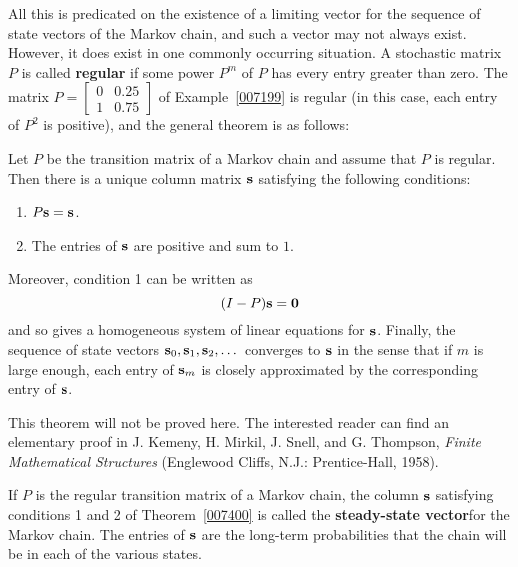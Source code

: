 \documentclass{ximera}
\begin{document}
All this is predicated on the existence of a limiting vector for the sequence of state vectors of the Markov chain, and such a vector may not always exist. However, it does exist in one commonly occurring situation. A stochastic matrix $P$ is called \textbf{regular} if some power $P^{m}$ of $P$ has every entry greater than zero. The matrix $P = \begin{bmatrix}
 0 & 0.25 \\
 1 & 0.75
\end{bmatrix}$
 of Example~\ref{007199} is regular (in this case, each entry of $P^{2}$ is positive), and the general theorem is as follows:


\begin{theorem}\label{007400}
Let $P$ be the transition matrix of a Markov chain and assume that $P$ is regular. Then there is a unique column matrix ${\bf s}$ satisfying the following conditions:


\begin{enumerate}
\item $P{\bf s} = {\bf s}$.

\item The entries of ${\bf s}$ are positive and sum to $1$.

\end{enumerate}

Moreover, condition 1 can be written as
\begin{equation*}
(I - P){\bf s} = {\bf 0}
\end{equation*}
and so gives a homogeneous system of linear equations for ${\bf s}$. Finally, the sequence of state vectors ${\bf s}_{0}, {\bf s}_{1}, {\bf s}_{2}, \dots$ converges to ${\bf s}$ in the sense that if $m$ is large enough, each entry of ${\bf s}_{m}$ is closely approximated by the corresponding entry of ${\bf s}$.
\end{theorem}

\noindent This theorem will not be proved here.  The interested reader can find an elementary proof in J. Kemeny, H. Mirkil, J. Snell, and G. Thompson, \textit{Finite Mathematical Structures} (Englewood Cliffs, N.J.: Prentice-Hall, 1958).

If $P$ is the regular transition matrix of a Markov chain, the column ${\bf s}$ satisfying conditions 1 and 2 of Theorem~\ref{007400} is called the \textbf{steady-state vector}for the Markov chain. The entries of ${\bf s}$ are the long-term probabilities that the chain will be in each of the various states.
\end{document}
